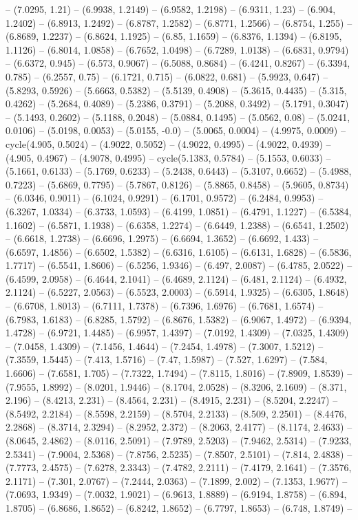 -- (7.0295, 1.21) -- (6.9938, 1.2149) -- (6.9582, 1.2198) -- (6.9311, 1.23) -- (6.904, 1.2402) -- (6.8913, 1.2492) -- (6.8787, 1.2582) -- (6.8771, 1.2566) -- (6.8754, 1.255) -- (6.8689, 1.2237) -- (6.8624, 1.1925) -- (6.85, 1.1659) -- (6.8376, 1.1394) -- (6.8195, 1.1126) -- (6.8014, 1.0858) -- (6.7652, 1.0498) -- (6.7289, 1.0138) -- (6.6831, 0.9794) -- (6.6372, 0.945) -- (6.573, 0.9067) -- (6.5088, 0.8684) -- (6.4241, 0.8267) -- (6.3394, 0.785) -- (6.2557, 0.75) -- (6.1721, 0.715) -- (6.0822, 0.681) -- (5.9923, 0.647) -- (5.8293, 0.5926) -- (5.6663, 0.5382) -- (5.5139, 0.4908) -- (5.3615, 0.4435) -- (5.315, 0.4262) -- (5.2684, 0.4089) -- (5.2386, 0.3791) -- (5.2088, 0.3492) -- (5.1791, 0.3047) -- (5.1493, 0.2602) -- (5.1188, 0.2048) -- (5.0884, 0.1495) -- (5.0562, 0.08) -- (5.0241, 0.0106) -- (5.0198, 0.0053) -- (5.0155, -0.0) -- (5.0065, 0.0004) -- (4.9975, 0.0009) -- cycle(4.905, 0.5024) -- (4.9022, 0.5052) -- (4.9022, 0.4995) -- (4.9022, 0.4939) -- (4.905, 0.4967) -- (4.9078, 0.4995) -- cycle(5.1383, 0.5784) -- (5.1553, 0.6033) -- (5.1661, 0.6133) -- (5.1769, 0.6233) -- (5.2438, 0.6443) -- (5.3107, 0.6652) -- (5.4988, 0.7223) -- (5.6869, 0.7795) -- (5.7867, 0.8126) -- (5.8865, 0.8458) -- (5.9605, 0.8734) -- (6.0346, 0.9011) -- (6.1024, 0.9291) -- (6.1701, 0.9572) -- (6.2484, 0.9953) -- (6.3267, 1.0334) -- (6.3733, 1.0593) -- (6.4199, 1.0851) -- (6.4791, 1.1227) -- (6.5384, 1.1602) -- (6.5871, 1.1938) -- (6.6358, 1.2274) -- (6.6449, 1.2388) -- (6.6541, 1.2502) -- (6.6618, 1.2738) -- (6.6696, 1.2975) -- (6.6694, 1.3652) -- (6.6692, 1.433) -- (6.6597, 1.4856) -- (6.6502, 1.5382) -- (6.6316, 1.6105) -- (6.6131, 1.6828) -- (6.5836, 1.7717) -- (6.5541, 1.8606) -- (6.5256, 1.9346) -- (6.497, 2.0087) -- (6.4785, 2.0522) -- (6.4599, 2.0958) -- (6.4644, 2.1041) -- (6.4689, 2.1124) -- (6.481, 2.1124) -- (6.4932, 2.1124) -- (6.5227, 2.0563) -- (6.5523, 2.0003) -- (6.5914, 1.9325) -- (6.6305, 1.8648) -- (6.6708, 1.8013) -- (6.7111, 1.7378) -- (6.7396, 1.6976) -- (6.7681, 1.6574) -- (6.7983, 1.6183) -- (6.8285, 1.5792) -- (6.8676, 1.5382) -- (6.9067, 1.4972) -- (6.9394, 1.4728) -- (6.9721, 1.4485) -- (6.9957, 1.4397) -- (7.0192, 1.4309) -- (7.0325, 1.4309) -- (7.0458, 1.4309) -- (7.1456, 1.4644) -- (7.2454, 1.4978) -- (7.3007, 1.5212) -- (7.3559, 1.5445) -- (7.413, 1.5716) -- (7.47, 1.5987) -- (7.527, 1.6297) -- (7.584, 1.6606) -- (7.6581, 1.705) -- (7.7322, 1.7494) -- (7.8115, 1.8016) -- (7.8909, 1.8539) -- (7.9555, 1.8992) -- (8.0201, 1.9446) -- (8.1704, 2.0528) -- (8.3206, 2.1609) -- (8.371, 2.196) -- (8.4213, 2.231) -- (8.4564, 2.231) -- (8.4915, 2.231) -- (8.5204, 2.2247) -- (8.5492, 2.2184) -- (8.5598, 2.2159) -- (8.5704, 2.2133) -- (8.509, 2.2501) -- (8.4476, 2.2868) -- (8.3714, 2.3294) -- (8.2952, 2.372) -- (8.2063, 2.4177) -- (8.1174, 2.4633) -- (8.0645, 2.4862) -- (8.0116, 2.5091) -- (7.9789, 2.5203) -- (7.9462, 2.5314) -- (7.9233, 2.5341) -- (7.9004, 2.5368) -- (7.8756, 2.5235) -- (7.8507, 2.5101) -- (7.814, 2.4838) -- (7.7773, 2.4575) -- (7.6278, 2.3343) -- (7.4782, 2.2111) -- (7.4179, 2.1641) -- (7.3576, 2.1171) -- (7.301, 2.0767) -- (7.2444, 2.0363) -- (7.1899, 2.002) -- (7.1353, 1.9677) -- (7.0693, 1.9349) -- (7.0032, 1.9021) -- (6.9613, 1.8889) -- (6.9194, 1.8758) -- (6.894, 1.8705) -- (6.8686, 1.8652) -- (6.8242, 1.8652) -- (6.7797, 1.8653) -- (6.748, 1.8749) -- 